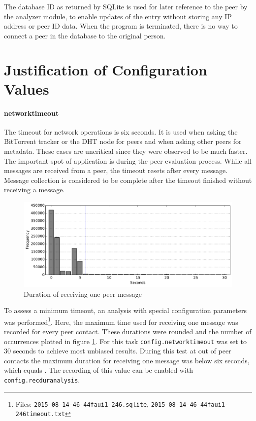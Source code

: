 \documentclass[10pt, a4paper, twoside, headsepline]{scrbook}
\renewcommand{\_}{\origunderscore\allowbreak}
\newcommand{\config}[1]{\texttt{config.\allowbreak #1}}
\begin{document}
The database ID as returned by SQLite is used for later reference to the peer by the analyzer module, to enable updates of the entry without storing any IP address or peer ID data. When the program is terminated, there is no way to connect a peer in the database to the original person.

\section{Justification of Configuration Values}
\paragraph{network\_timeout}
The timeout for network operations is six seconds. It is used when asking the BitTorrent tracker or the DHT node for peers and when asking other peers for metadata. These cases are uncritical since they were observed to be much faster. The important spot of application is during the peer evaluation process. While all messages are received from a peer, the timeout resets after every message. Message collection is considered to be complete after the timeout finished without receiving a message.

\begin{figure}
\centering
\includegraphics[width=\textwidth]{../result/2015-08-14_17-46-44_faui1-246_timeout}
\caption{Duration of receiving one peer message}
\label{timeout-calibration}
\end{figure}

To assess a minimum timeout, an analysis with special configuration parameters was performed\footnote{Files: \texttt{2015-08-14\_17-46-44\_faui1-246.sqlite}, \texttt{2015-08-14\_17-46-44\_faui1-246\_timeout.txt}}. Here, the maximum time used for receiving one message was recorded for every peer contact. These durations were rounded and the number of occurrences plotted in figure \ref{timeout-calibration}. For this task \config{network\_timeout} was set to 30 seconds to achieve most unbiased results. During this test at  out of  peer contacts the maximum duration for receiving one message was below six seconds, which equals . The recording of this value can be enabled with \config{rec\_dur\_analysis}.
\end{document}
